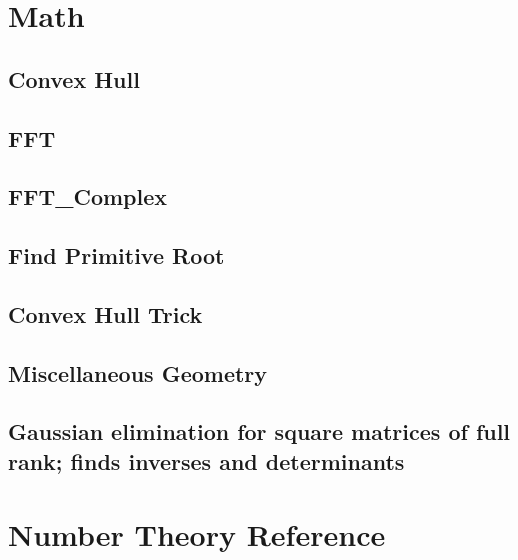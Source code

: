 \documentclass[12pt]{extarticle}
\begin{document}
\begin{multicols*}{2}
\section{Math}

\subsection{Convex Hull} %


\subsection{FFT} %


\subsection{FFT\_Complex} %


\subsection{Find Primitive Root } %


\subsection{Convex Hull Trick} %



\subsection{Miscellaneous Geometry} %


\subsection{Gaussian elimination for square matrices of full rank; finds
inverses and determinants} %


\section{Number Theory Reference}

% 


\end{multicols*}
\end{document}
